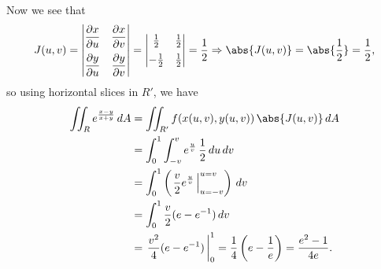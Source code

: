 \begin{example}
 Now we see that
 \[
 J(u,v) =
   \begin{vmatrix}
    \dfrac{\partial x}{\partial u} & \dfrac{\partial x}{\partial v}\vspace{2mm}\\
    \dfrac{\partial y}{\partial u} & \dfrac{\partial y}{\partial v}
   \end{vmatrix}
   =\begin{vmatrix}
    \frac12 & \frac12\vspace{2mm}\\
    -\frac12 & \frac12
   \end{vmatrix}
   = \frac12 \Rightarrow \abs{J(u,v)} = \abs{\frac12} = \frac12 ,
 \]
 so using horizontal slices in $R'$, we have
 \begin{align*}
  \iint_{R} e^{\frac{x-y}{x+y}} \,dA &= \iint_{R'} f(x(u,v),y(u,v))\,\abs{J(u,v)}\,dA\\
  &= \int_0^1 \int_{-v}^v e^{\frac uv} \, \frac12\,du\,dv\\
  &= \int_0^1 \left(\left. \frac v2 e^{\frac uv} \,\right|_{u=-v}^{u=v} \right) \,dv\\
  &= \int_0^1 \frac v2 (e - e^{-1})\,dv\\
  &= \left.\frac{v^2}4 (e - e^{-1}) \,\right|_{0}^{1}
  = \frac14 \left( e - \frac1e \right) = \frac{e^2 - 1}{4e}.
 \end{align*}
\end{example}

